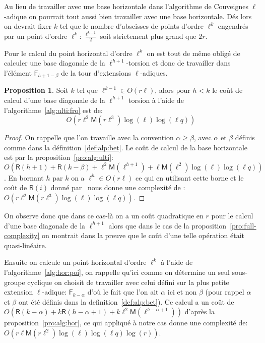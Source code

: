 \documentclass[10pt,a4paper]{book}
\theoremstyle{plain}
\theoremstyle{definition}
\theoremstyle{definition}
\theoremstyle{definition}
\newtheorem{prop}[thm]{Proposition}
\theoremstyle{definition}
\theoremstyle{remark}
\theoremstyle{remark}
\theoremstyle{definition}
\begin{document}
Au lieu de travailler avec une base horizontale dans l'algorithme de Couveignes
$\ell$-adique on pourrait tout aussi bien travailler avec une base horizontale.
Dés lors on devrait fixer $k$ tel que le nombre d'abscisses de points d'ordre 
$\ell^k$ engendrés par un point d'ordre $\ell^k$: $\frac{\ell^{k-1}}{2}$ soit 
strictement plus grand que $2r$.

Pour le calcul du point horizontal d'ordre $\ell^k$ on est tout de même obligé 
de calculer une base diagonale de la $\ell^{h+1}$-torsion et donc de 
travailler dans l'élément $\mathsf{F}_{h+1-\beta}$ de la tour d'extensions 
$\ell$-adiques.

\begin{prop}
Soit $k$ tel que $\ell^{k-1} \in O(r\ell)$, alors pour $h<k$ le coût de calcul d'une 
base diagonale de la $\ell^{h+1}$ torsion à l'aide de 
l'algorithme~\ref{alg:ulti:fro} est de:
\[
O(r \ell^{2} \mathsf{M}(r\ell^{3})\log(\ell)\log(\ell q) )
\]
\end{prop}

\begin{proof}
On rappelle que l'on travaille avec la convention $\alpha \geqslant \beta$, 
avec $\alpha$ et $\beta$ définis comme dans la définition~\ref{def:alp:bet}.
Le coût de calcul de la base horizontale est par la proposition~\ref{pro:alg:ulti}:
$O(\mathsf{R}(h+1)+ \mathsf{R}(k-\beta)+\ell^2 \mathsf{M}(\ell^{h+1})+\ell \mathsf{M}(\ell^2)\log(\ell)\log(\ell q))$. 
En bornant $h$ par $k$ on a $\ell^h \in O(r\ell)$ ce qui en utilisant cette
borne et le coût de $\mathsf{R}(i)$ donné par~\cite[chapter 14.5]{vzGJG03} nous 
donne une complexité de :
$O(r \ell^{2} \mathsf{M}(r\ell^{3})\log(\ell)\log(\ell q) )$.
\end{proof}
On observe donc que dans ce cas-là on a un coût quadratique en $r$ pour le 
calcul d'une base diagonale de la $\ell^{h+1}$ alors que dans le cas de la 
proposition~\ref{pro:full-complexity} on montrait dans la preuve que le coût 
d'une telle opération était quasi-linéaire.

Ensuite on calcule un point horizontal d'ordre $\ell^k$ à l'aide de 
l'algorithme~\ref{alg:hor:poi}, on rappelle qu'ici comme on détermine un seul 
sous-groupe cyclique on choisit de travailler avec celui défini 
sur la plus petite extension $\ell$-adique: $\mathsf{F}_{k-\alpha}$ d'où le 
fait que l'on ait $\alpha$ ici et non $\beta$ (pour rappel $\alpha$ et $\beta$ 
ont été définis dans la definition~\ref{def:alp:bet}). Ce calcul a un coût de 
$O(\mathsf{R}(k-\alpha) + k\mathsf{R}(h-\alpha+1) + k\ell^2\mathsf{M}(\ell^{h-\alpha+1}))$
d'après la proposition~\ref{pro:alg:hor}, ce qui appliqué à notre cas donne 
une complexité de: $O(r \ell \mathsf{M}(r \ell^{2})\log(\ell)\log(\ell q) \log(r))$.
\end{document}
